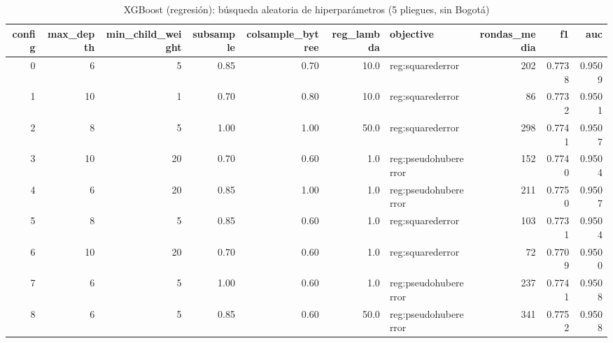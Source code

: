 \begin{table}[ht]
\centering
\begin{tabular}{rrrrrrlrrr}
  \hline
config & max\_depth & min\_child\_weight & subsample & colsample\_bytree & reg\_lambda & objective & rondas\_media & f1 & auc \\ 
  \hline
0 & 6 & 5 & 0.85 & 0.70 & 10.0 & reg:squarederror & 202 & 0.7738 & 0.9509 \\ 
  1 & 10 & 1 & 0.70 & 0.80 & 10.0 & reg:squarederror & 86 & 0.7732 & 0.9501 \\ 
  2 & 8 & 5 & 1.00 & 1.00 & 50.0 & reg:squarederror & 298 & 0.7741 & 0.9507 \\ 
  3 & 10 & 20 & 0.70 & 0.60 & 1.0 & reg:pseudohubererror & 152 & 0.7740 & 0.9504 \\ 
  4 & 6 & 20 & 0.85 & 1.00 & 1.0 & reg:pseudohubererror & 211 & 0.7750 & 0.9507 \\ 
  5 & 8 & 5 & 0.85 & 0.60 & 1.0 & reg:squarederror & 103 & 0.7731 & 0.9504 \\ 
  6 & 10 & 20 & 0.70 & 0.60 & 1.0 & reg:squarederror & 72 & 0.7709 & 0.9500 \\ 
  7 & 6 & 5 & 1.00 & 0.60 & 1.0 & reg:pseudohubererror & 237 & 0.7741 & 0.9508 \\ 
  8 & 6 & 5 & 0.85 & 0.60 & 50.0 & reg:pseudohubererror & 341 & 0.7752 & 0.9508 \\ 
   \hline
\end{tabular}
\caption{XGBoost (regresión): búsqueda aleatoria de hiperparámetros (5 pliegues, sin Bogotá)} 
\end{table}
